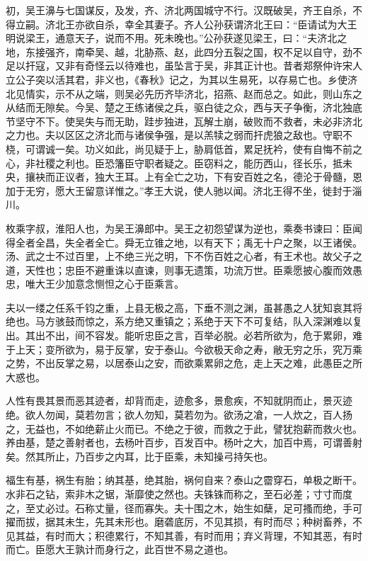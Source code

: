 \documentclass[12pt,UTF8]{ctexbook}
\begin{document}
初，吴王濞与七国谋反，及发，齐、济北两国城守不行。汉既破吴，齐王自杀，不得立嗣。济北王亦欲自杀，幸全其妻子。齐人公孙获谓济北王曰：“臣请试为大王明说梁王，通意天子，说而不用。死未晚也。”公孙获遂见梁王，曰：“夫济北之地，东接强齐，南牵吴、越，北胁燕、赵，此四分五裂之国，权不足以自守，劲不足以扞寇，又非有奇怪云以待难也，虽坠言于吴，非其正计也。昔者郑祭仲许宋人立公子突以活其君，非义也，《春秋》记之，为其以生易死，以存易亡也。乡使济北见情实，示不从之端，则吴必先历齐毕济北，招燕、赵而总之。如此，则山东之从结而无隙矣。今吴、楚之王练诸侯之兵，驱白徒之众，西与天子争衡，济北独底节坚守不下。使吴失与而无助，跬步独进，瓦解土崩，破败而不救者，未必非济北之力也。夫以区区之济北而与诸侯争强，是以羔犊之弱而扞虎狼之敌也。守职不桡，可谓诚一矣。功义如此，尚见疑于上，胁肩低首，累足抚衿，使有自悔不前之心，非社稷之利也。臣恐籓臣守职者疑之。臣窃料之，能历西山，径长乐，抵未央，攘袂而正议者，独大王耳。上有全亡之功，下有安百姓之名，德沦于骨髓，恩加于无穷，愿大王留意详惟之。”孝王大说，使人驰以闻。济北王得不坐，徙封于淄川。



枚乘字叔，淮阳人也，为吴王濞郎中。吴王之初怨望谋为逆也，乘奏书谏曰：臣闻得全者全昌，失全者全亡。舜无立锥之地，以有天下；禹无十户之聚，以王诸侯。汤、武之士不过百里，上不绝三光之明，下不伤百姓之心者，有王术也。故父子之道，天性也；忠臣不避重诛以直谏，则事无遗策，功流万世。臣乘愿披心腹而效愚忠，唯大王少加意念恻怛之心于臣乘言。



夫以一缕之任系千钧之重，上县无极之高，下垂不测之渊，虽甚愚之人犹知哀其将绝也。马方骇鼓而惊之，系方绝又重镇之；系绝于天下不可复结，队入深渊难以复出。其出不出，间不容发。能听忠臣之言，百举必脱。必若所欲为，危于累卵，难于上天；变所欲为，易于反掌，安于泰山。今欲极天命之寿，敝无穷之乐，究万乘之势，不出反掌之易，以居泰山之安，而欲乘累卵之危，走上天之难，此愚臣之所大惑也。



人性有畏其景而恶其迹者，却背而走，迹愈多，景愈疾，不知就阴而止，景灭迹绝。欲人勿闻，莫若勿言；欲人勿知，莫若勿为。欲汤之凔，一人炊之，百人扬之，无益也，不如绝薪止火而已。不绝之于彼，而救之于此，譬犹抱薪而救火也。养由基，楚之善射者也，去杨叶百步，百发百中。杨叶之大，加百中焉，可谓善射矣。然其所止，乃百步之内耳，比于臣乘，未知操弓持矢也。



福生有基，祸生有胎；纳其基，绝其胎，祸何自来？泰山之霤穿石，单极之断干。水非石之钻，索非木之锯，渐靡使之然也。夫铢铢而称之，至石必差；寸寸而度之，至丈必过。石称丈量，径而寡失。夫十围之木，始生如蘖，足可搔而绝，手可擢而拔，据其未生，先其未形也。磨砻底厉，不见其损，有时而尽；种树畜养，不见其益，有时而大；积德累行，不知其善，有时而用；弃义背理，不知其恶，有时而亡。臣愿大王孰计而身行之，此百世不易之道也。
\end{document}
